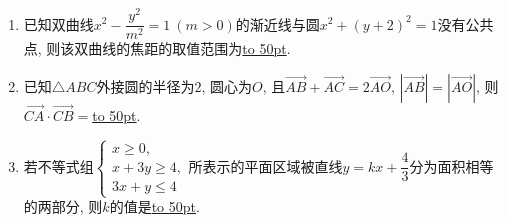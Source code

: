 \documentclass[10pt,a4paper]{article}
\newcommand{\blank}[1]{\underline{\hbox to #1pt{}}}
\begin{document}
\begin{enumerate}[1.]
\begin{center}
\end{center}
\item 已知双曲线$x^2-\dfrac{y^2}{m^2}=1 \ (m>0)$的渐近线与圆$x^2+(y+2)^2=1$没有公共点, 则该双曲线的焦距的取值范围为\blank{50}.
\item 已知$\triangle ABC$外接圆的半径为$2$, 圆心为$O$, 且$\overrightarrow{AB}+\overrightarrow{AC}=2 \overrightarrow{AO}$, $|\overrightarrow{AB}|=|\overrightarrow{AO}|$, 则$\overrightarrow{CA}\cdot \overrightarrow{CB}=$\blank{50}.
\item 若不等式组$\begin{cases} x\ge 0, \\ x+3y\ge 4, \\  3x+y\le 4 \end{cases}$所表示的平面区域被直线$y=kx+\dfrac 43$分为面积相等的两部分, 则$k$的值是\blank{50}.

\end{enumerate}
\end{document}
